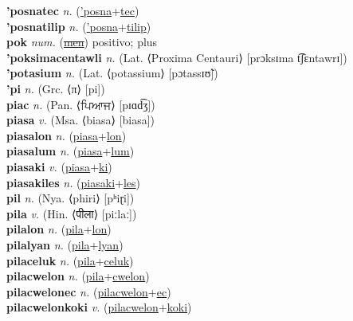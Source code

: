 \textbf{'posnatec} \textit{n.} (\hyperref['posna]{'posna}+\hyperref[tec]{tec})
 \label{'posnatec} \\
\textbf{'posnatilip} \textit{n.} (\hyperref['posna]{'posna}+\hyperref[tilip]{tilip})
 \label{'posnatilip} \\
\textbf{pok} \textit{num.} (\hyperref[men]{\sout{men}})
positivo; plus \label{pok} \\
\textbf{'poksimacentawli} \textit{n.} (Lat. ⟨Proxima Centauri⟩ [prɔksɪma t͡ʃɛntawrɪ])
 \label{'poksimacentawli} \\
\textbf{'potasium} \textit{n.} (Lat. ⟨potassium⟩ [pɔtassɪʊ̃])
 \label{'potasium} \\
\textbf{'pi} \textit{n.} (Grc. ⟨π⟩ [pi])
 \label{'pi} \\
\textbf{piac} \textit{n.} (Pan. ⟨ਪਿਆਜ⟩ [pɪɑd͡ʒ])
 \label{piac} \\
\textbf{piasa} \textit{v.} (Msa. ⟨biasa⟩ [biasa])
 \label{piasa} \\
\textbf{piasalon} \textit{n.} (\hyperref[piasa]{piasa}+\hyperref[lon]{lon})
 \label{piasalon} \\
\textbf{piasalum} \textit{n.} (\hyperref[piasa]{piasa}+\hyperref[lum]{lum})
 \label{piasalum} \\
\textbf{piasaki} \textit{v.} (\hyperref[piasa]{piasa}+\hyperref[ki]{ki})
 \label{piasaki} \\
\textbf{piasakiles} \textit{n.} (\hyperref[piasaki]{piasaki}+\hyperref[les]{les})
 \label{piasakiles} \\
\textbf{pil} \textit{n.} (Nya. ⟨phiri⟩ [pʰiɽi])
 \label{pil} \\
\textbf{pila} \textit{v.} (Hin. ⟨पीला⟩ [piːlaː])
 \label{pila} \\
\textbf{pilalon} \textit{n.} (\hyperref[pila]{pila}+\hyperref[lon]{lon})
 \label{pilalon} \\
\textbf{pilalyan} \textit{n.} (\hyperref[pila]{pila}+\hyperref[lyan]{lyan})
 \label{pilalyan} \\
\textbf{pilaceluk} \textit{n.} (\hyperref[pila]{pila}+\hyperref[celuk]{celuk})
 \label{pilaceluk} \\
\textbf{pilacwelon} \textit{n.} (\hyperref[pila]{pila}+\hyperref[cwelon]{cwelon})
 \label{pilacwelon} \\
\textbf{pilacwelonec} \textit{n.} (\hyperref[pilacwelon]{pilacwelon}+\hyperref[ec]{ec})
 \label{pilacwelonec} \\
\textbf{pilacwelonkoki} \textit{v.} (\hyperref[pilacwelon]{pilacwelon}+\hyperref[koki]{koki})
 \label{pilacwelonkoki} \\
